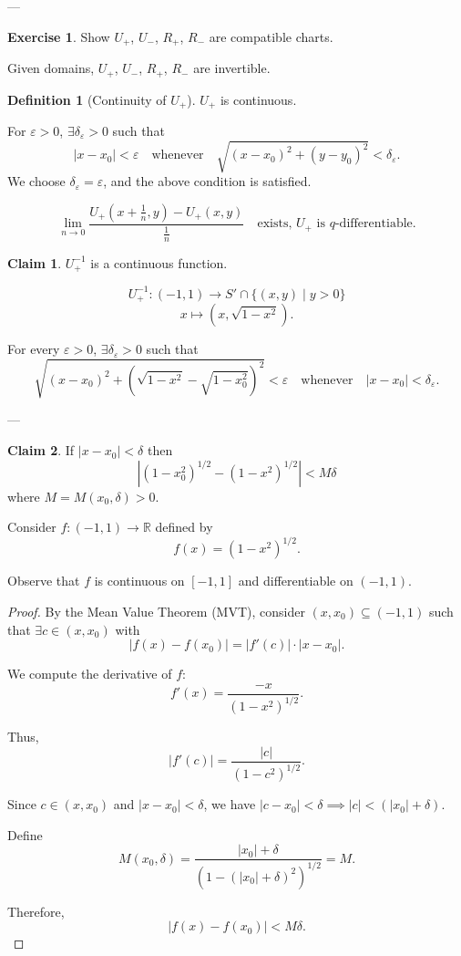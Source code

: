 \documentclass[11pt]{article}
\theoremstyle{definition}
\newtheorem{definition}{Definition}[section]
\newtheorem{claim}{Claim}
\newtheorem{exercise}{Exercise}
\theoremstyle{remark}
\begin{document}
---

\begin{exercise}
Show $U_+$, $U_-$, $R_+$, $R_-$ are compatible charts.
\end{exercise}

Given domains, $U_+$, $U_-$, $R_+$, $R_-$ are invertible.

\begin{definition}[Continuity of $U_+$]
$U_+$ is continuous.

For $\varepsilon > 0$, $\exists \delta_\varepsilon > 0$ such that
\[
|x - x_0| < \varepsilon \quad \text{whenever} \quad \sqrt{(x - x_0)^2 + (y - y_0)^2} < \delta_\varepsilon.
\]
We choose $\delta_\varepsilon = \varepsilon$, and the above condition is satisfied.
\end{definition}

\[
\lim_{n \to 0} \frac{U_+ (x + \frac{1}{n}, y) - U_+ (x, y)}{\frac{1}{n}} \quad \text{exists, $U_+$ is $q$-differentiable.}
\]

\begin{claim}
$U_+^{-1}$ is a continuous function.
\end{claim}

\[
U_+^{-1} : (-1, 1) \to S' \cap \{ (x, y) \mid y > 0 \}
\]
\[
x \mapsto (x, \sqrt{1 - x^2}).
\]

For every $\varepsilon > 0$, $\exists \delta_\varepsilon > 0$ such that
\[
\sqrt{(x - x_0)^2 + (\sqrt{1 - x^2} - \sqrt{1 - x_0^2})^2} < \varepsilon \quad \text{whenever} \quad |x - x_0| < \delta_\varepsilon.
\]

---

\begin{claim}
If $|x - x_0| < \delta$ then
\[
\left| (1 - x_0^2)^{1/2} - (1 - x^2)^{1/2} \right| < M \delta
\]
where $M = M(x_0, \delta) > 0$.
\end{claim}

Consider $f: (-1, 1) \to \mathbb{R}$ defined by
\[
f(x) = (1 - x^2)^{1/2}.
\]

Observe that $f$ is continuous on $[-1, 1]$ and differentiable on $(-1, 1)$.

\begin{proof}
By the Mean Value Theorem (MVT), consider $(x, x_0) \subseteq (-1, 1)$ such that $\exists c \in (x, x_0)$ with
\[
|f(x) - f(x_0)| = |f'(c)| \cdot |x - x_0|.
\]

We compute the derivative of $f$:
\[
f'(x) = \frac{-x}{(1 - x^2)^{1/2}}.
\]

Thus,
\[
|f'(c)| = \frac{|c|}{(1 - c^2)^{1/2}}.
\]

Since $c \in (x, x_0)$ and $|x - x_0| < \delta$, we have $|c - x_0| < \delta \implies |c| < (|x_0| + \delta)$.

Define
\[
M(x_0, \delta) = \frac{|x_0| + \delta}{(1 - (|x_0| + \delta)^2)^{1/2}} = M.
\]

Therefore,
\[
|f(x) - f(x_0)| < M \delta.
\]
\end{proof}
\end{document}
